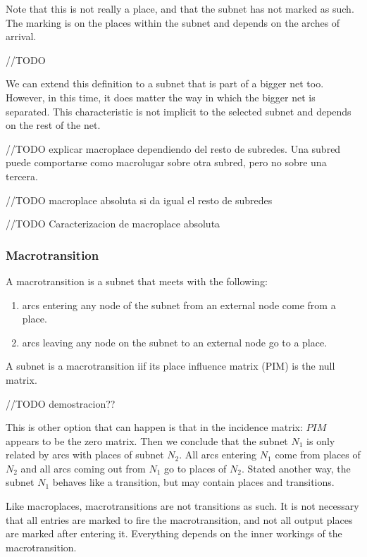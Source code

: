 {Note that this is not really a place, and that the subnet has not marked as such. The marking is on the places within the subnet and depends on the arches of arrival.
\begin{example}[Macroplace]
//TODO
\end{example}

We can extend this definition to a subnet that is part of a bigger net too. However, in this time, it does matter the way in which the bigger net is separated. This characteristic is not implicit to the selected subnet and depends on the rest of the net.

//TODO explicar macroplace dependiendo del resto de subredes. Una subred puede comportarse como macrolugar sobre otra subred, pero no sobre una tercera.

//TODO macroplace absoluta si da igual el resto de subredes

//TODO Caracterizacion de macroplace absoluta

\subsubsection{Macrotransition}
\begin{definition}[Macrotransition]
A macrotransition is a subnet that meets with the following:
\begin{enumerate}
 \item arcs entering any node of the subnet from an external node come from a place.
 \item arcs leaving any node on the subnet to an external node go to a place.
\end{enumerate}
\end{definition}

\begin{proposition}
A subnet is a macrotransition iif its place influence matrix (PIM) is the null matrix.
\end{proposition}
//TODO demostracion??

This is other option that can happen is that in the incidence matrix: $PIM$ appears to be the zero matrix. Then we conclude that the subnet $N_1$ is only related by arcs with places of subnet $N_2$. All arcs entering $N_1$ come from places of $N_2$ and all arcs coming out from $N_1$ go to places of $N_2$. Stated another way, the subnet $N_1$ behaves like a transition, but may contain places and transitions.

Like macroplaces, macrotransitions are not transitions as such. It is not necessary that all entries are marked to fire the macrotransition, and not all output places are marked after entering it. Everything depends on the inner workings of the macrotransition.

}
